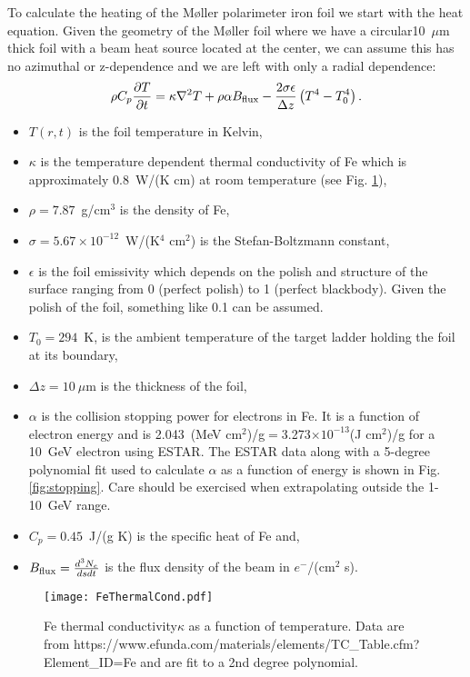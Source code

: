 \documentclass[12pt]{article}
\begin{document}
To calculate the heating of the M\o ller polarimeter iron foil we start with the heat equation. Given the geometry of the M\o ller foil where we have a circular10~$\mu$m thick foil with a beam heat source located at the center, we can assume this has no azimuthal or z-dependence and we are left with only a radial dependence:
\begin{equation}
\label{eq:heat_T_r_t}
\rho C_p\frac{\partial T}{\partial t}=\kappa\nabla^2T+\rho\alpha B_{\rm flux}-\frac{2\sigma\epsilon}{\Delta z}\left(T^4-T_0^4\right).
\end{equation}
\begin{itemize}
\item{$T(r, t)$ is the foil temperature in Kelvin,}
\item{$\kappa$ is the temperature dependent thermal conductivity of Fe which is approximately 0.8~W/(K cm) at room temperature (see Fig. \ref{fig:conductivity}),}
\item{$\rho =7.87$~g/cm$^3$ is the density of Fe,}
\item{$\sigma =5.67\times 10^{-12}$~W/(K$^4$ cm$^2$) is the Stefan-Boltzmann constant,}
\item{$\epsilon$ is the foil emissivity which depends on the polish and structure of the surface ranging from 0 (perfect polish) to 1 (perfect blackbody). Given the polish of the foil, something like 0.1 can be assumed.}
\item{$T_0=294$~K, is the ambient temperature of the target ladder holding the foil at its boundary,}
\item{$\Delta z=10~\mu$m is the thickness of the foil,}
\item{$\alpha$ is the collision stopping power for electrons in Fe. It is a function of electron energy and is 2.043~(MeV cm$^2$)/g$=$3.273$\times 10^{-13}$(J cm$^2$)/g for a 10~GeV electron using ESTAR. The ESTAR data along with a 5-degree polynomial fit used to calculate $\alpha$ as a function of energy is shown in Fig. \ref{fig:stopping}. Care should be exercised when extrapolating outside the 1-10~GeV range.}
\item{$C_p=0.45$~J/(g K) is the specific heat of Fe and,} 
\item{$B_{\rm flux}=\frac{d^3N_e}{ds dt} $ is the flux density of the beam in $e^-$/(cm$^2$ s).}
\end{itemize}
\begin{figure}[h]
\centering
\texttt{[image: FeThermalCond.pdf]}
\caption{\label{fig:conductivity} Fe thermal conductivity$\kappa$ as a function of temperature. Data are from https://www.efunda.com/materials/elements/TC\_Table.cfm?Element\_ID=Fe and are fit to a 2nd degree polynomial.}
\end{figure}
\end{document}
